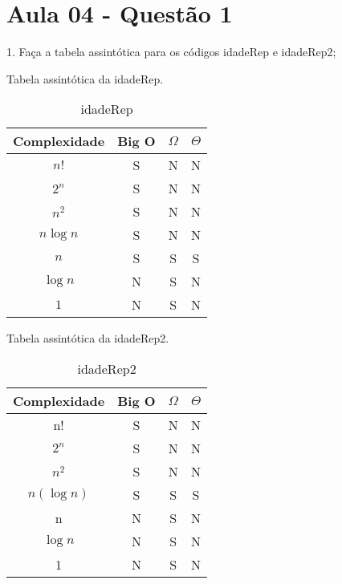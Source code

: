 \section{Aula 04 - Questão 1}

1. Faça a tabela assintótica para os códigos idadeRep e idadeRep2;

Tabela assintótica da idadeRep. 

\begin{table}[ht!]
    \centering
    \begin{tabular}{|c|c|c|c|}
    \hline
    \textbf{Complexidade} & \textbf{Big O} & $\Omega$ & $\Theta$ \\ \hline
    $n!$ & S & N & N \\ \hline
    $2^n$ & S & N & N \\ \hline
    $n^2$ & S & N & N \\ \hline
    $n\log n$ & S & N & N \\ \hline
    $n$ & S & S & S \\ \hline
    $\log n$ & N & S & N \\ \hline
    $1$ & N & S & N \\ \hline 
    \end{tabular}
    \caption{idadeRep}
\end{table}

Tabela assintótica da idadeRep2. 

\begin{table}[ht!]
    \centering
    \begin{tabular}{|c|c|c|c|}
    \hline
    \textbf{Complexidade} & \textbf{Big O} & $\Omega$ & $\Theta$ \\ \hline
    n! & S & N & N \\ \hline
    $2^n$ & S & N & N \\ \hline
    $n^2$ & S & N & N \\ \hline
    $n(\log n)$ & S & S & S \\ \hline
    n & N & S & N \\ \hline
    $\log n$ & N & S & N \\ \hline
    1 & N & S & N \\ \hline 
    \end{tabular}
    \caption{idadeRep2}
\end{table}